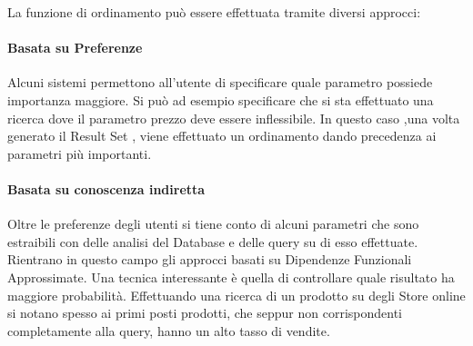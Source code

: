 La funzione di ordinamento può essere effettuata tramite diversi approcci:
\paragraph{Basata su Preferenze}
Alcuni sistemi permettono all'utente di specificare quale parametro possiede importanza maggiore. Si può ad esempio specificare che si sta effettuato una ricerca dove il parametro prezzo deve essere inflessibile. In questo caso ,una volta generato il Result Set , viene effettuato un ordinamento dando precedenza ai parametri più importanti.\cite{query_answering}
\paragraph{Basata su conoscenza indiretta}
Oltre le preferenze degli utenti si tiene conto di alcuni parametri che sono estraibili con delle analisi del Database e delle query su di esso effettuate.
Rientrano in questo campo gli approcci basati su Dipendenze Funzionali Approssimate.
Una tecnica interessante è quella di controllare quale risultato ha maggiore probabilità. Effettuando una ricerca di un prodotto su degli Store online si notano spesso ai primi posti prodotti, che seppur non corrispondenti completamente alla query, hanno un alto tasso di vendite. 


